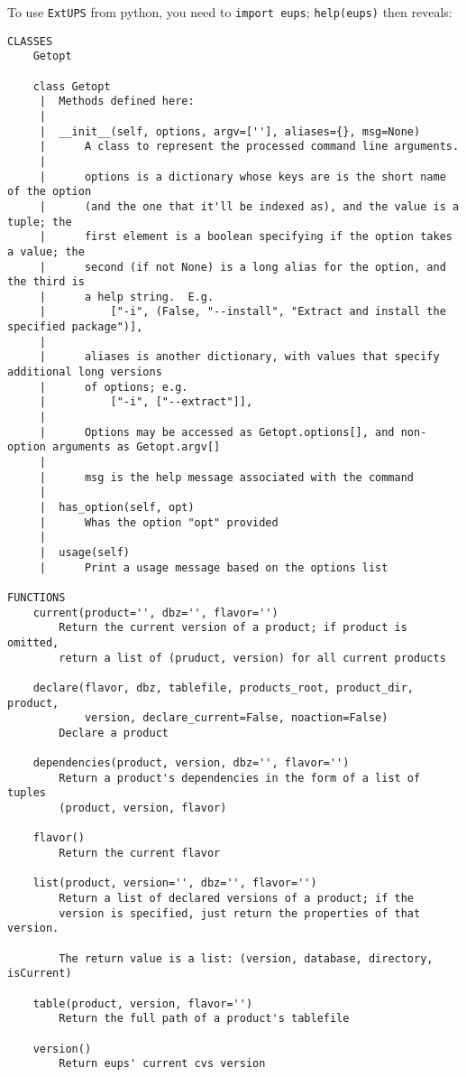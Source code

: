 \documentclass{article}
\newcommand{\code}[1]{\texttt{#1}}
\newcommand{\eups}{\code{ExtUPS}}
\begin{document}
To use \eups{} from python, you need to \code{import eups};
\code{help(eups)} then reveals:
\begin{verbatim}
CLASSES
    Getopt
    
    class Getopt
     |  Methods defined here:
     |  
     |  __init__(self, options, argv=[''], aliases={}, msg=None)
     |      A class to represent the processed command line arguments.
     |      
     |      options is a dictionary whose keys are is the short name of the option
     |      (and the one that it'll be indexed as), and the value is a tuple; the
     |      first element is a boolean specifying if the option takes a value; the
     |      second (if not None) is a long alias for the option, and the third is
     |      a help string.  E.g.
     |          ["-i", (False, "--install", "Extract and install the specified package")],
     |      
     |      aliases is another dictionary, with values that specify additional long versions
     |      of options; e.g.
     |          ["-i", ["--extract"]],
     |      
     |      Options may be accessed as Getopt.options[], and non-option arguments as Getopt.argv[]
     |      
     |      msg is the help message associated with the command
     |  
     |  has_option(self, opt)
     |      Whas the option "opt" provided
     |  
     |  usage(self)
     |      Print a usage message based on the options list

FUNCTIONS
    current(product='', dbz='', flavor='')
        Return the current version of a product; if product is omitted,
        return a list of (pruduct, version) for all current products
    
    declare(flavor, dbz, tablefile, products_root, product_dir, product,
            version, declare_current=False, noaction=False)
        Declare a product
    
    dependencies(product, version, dbz='', flavor='')
        Return a product's dependencies in the form of a list of tuples
        (product, version, flavor)
    
    flavor()
        Return the current flavor
    
    list(product, version='', dbz='', flavor='')
        Return a list of declared versions of a product; if the
        version is specified, just return the properties of that version.
        
        The return value is a list: (version, database, directory, isCurrent)
    
    table(product, version, flavor='')
        Return the full path of a product's tablefile
    
    version()
        Return eups' current cvs version
\end{verbatim}
\end{document}
